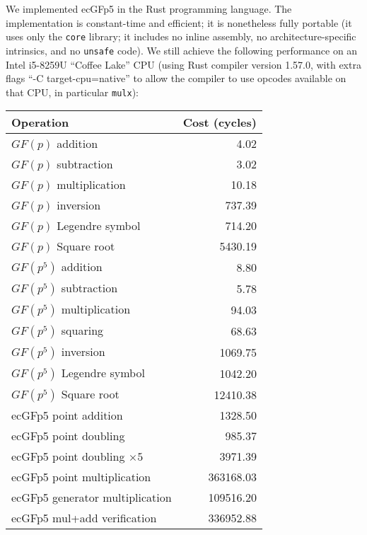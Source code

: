 \documentclass{llncs}
\newcommand{\GF}{GF}
\begin{document}
We implemented ecGFp5 in the Rust programming language. The
implementation is constant-time and efficient; it is nonetheless fully
portable (it uses only the \verb+core+ library; it includes no inline
assembly, no architecture-specific intrinsics, and no \verb+unsafe+
code). We still achieve the following performance on an Intel i5-8259U
``Coffee Lake'' CPU (using Rust compiler version 1.57.0, with
extra flags ``-C target-cpu=native'' to allow the compiler to use
opcodes available on that CPU, in particular \verb+mulx+):
\begin{center}
    \begin{tabular}{|l|r|}
        \hline
        \textsf{\textbf{Operation}} & \textsf{\textbf{Cost (cycles)}} \\
        \hline
        $\GF(p)$ addition                &      4.02 \\
        $\GF(p)$ subtraction             &      3.02 \\
        $\GF(p)$ multiplication          &     10.18 \\
        $\GF(p)$ inversion               &    737.39 \\
        $\GF(p)$ Legendre symbol         &    714.20 \\
        $\GF(p)$ Square root             &   5430.19 \\
        \hline
        $\GF(p^5)$ addition              &      8.80 \\
        $\GF(p^5)$ subtraction           &      5.78 \\
        $\GF(p^5)$ multiplication        &     94.03 \\
        $\GF(p^5)$ squaring              &     68.63 \\
        $\GF(p^5)$ inversion             &   1069.75 \\
        $\GF(p^5)$ Legendre symbol       &   1042.20 \\
        $\GF(p^5)$ Square root           &  12410.38 \\
        \hline
        ecGFp5 point addition            &   1328.50 \\
        ecGFp5 point doubling            &    985.37 \\
        ecGFp5 point doubling $\times 5$ &   3971.39 \\
        ecGFp5 point multiplication      & 363168.03 \\
        ecGFp5 generator multiplication  & 109516.20 \\
        ecGFp5 mul+add verification      & 336952.88 \\
        \hline
    \end{tabular}
\end{center}
\end{document}
